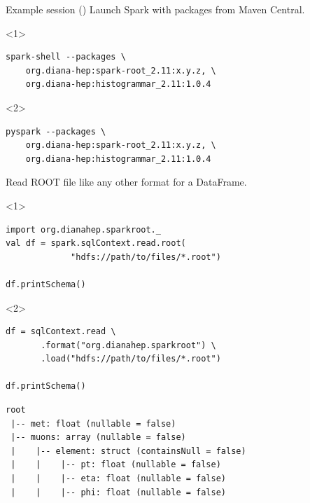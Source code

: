 \documentclass{beamer}
\begin{document}
\begin{frame}[fragile]{Example session ()}
\vspace{0.5 cm}
Launch Spark with packages from Maven Central.
\small
\begin{onlyenv}<1>
\begin{verbatim}
spark-shell --packages \
    org.diana-hep:spark-root_2.11:x.y.z, \
    org.diana-hep:histogrammar_2.11:1.0.4
\end{verbatim}
\end{onlyenv}
\begin{onlyenv}<2>
\begin{verbatim}
pyspark --packages \
    org.diana-hep:spark-root_2.11:x.y.z, \
    org.diana-hep:histogrammar_2.11:1.0.4
\end{verbatim}
\end{onlyenv}

\normalsize
Read ROOT file like any other format for a DataFrame.

\small
\begin{onlyenv}<1>
\begin{verbatim}
import org.dianahep.sparkroot._
val df = spark.sqlContext.read.root(
             "hdfs://path/to/files/*.root")

df.printSchema()
\end{verbatim}
\end{onlyenv}
\begin{onlyenv}<2>
\begin{verbatim}
df = sqlContext.read \
       .format("org.dianahep.sparkroot") \
       .load("hdfs://path/to/files/*.root")

df.printSchema()
\end{verbatim}
\end{onlyenv}

\begin{verbatim}
root
 |-- met: float (nullable = false)
 |-- muons: array (nullable = false)
 |    |-- element: struct (containsNull = false)
 |    |    |-- pt: float (nullable = false)
 |    |    |-- eta: float (nullable = false)
 |    |    |-- phi: float (nullable = false)
\end{verbatim}
\end{frame}
\end{document}

